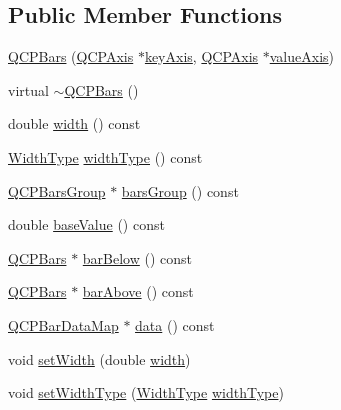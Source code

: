 \subsection*{Public Member Functions}
\begin{DoxyCompactItemize}
\item 
\hyperlink{class_q_c_p_bars_a64006999ad9dff308f40df41cef176ad}{Q\+C\+P\+Bars} (\hyperlink{class_q_c_p_axis}{Q\+C\+P\+Axis} $\ast$\hyperlink{class_q_c_p_abstract_plottable_a72c7a09c22963f2c943f07112b311103}{key\+Axis}, \hyperlink{class_q_c_p_axis}{Q\+C\+P\+Axis} $\ast$\hyperlink{class_q_c_p_abstract_plottable_a3106f9d34d330a6097a8ec5905e5b519}{value\+Axis})
\item 
virtual \hyperlink{class_q_c_p_bars_a4d880e28031ef120603f543379be2f22}{$\sim$\+Q\+C\+P\+Bars} ()
\item 
double \hyperlink{class_q_c_p_bars_a42798c38abd5f5db22bd45d77f429625}{width} () const 
\item 
\hyperlink{class_q_c_p_bars_a65dbbf1ab41cbe993d71521096ed4649}{Width\+Type} \hyperlink{class_q_c_p_bars_a8606651ada5804075f6affd04c88dd05}{width\+Type} () const 
\item 
\hyperlink{class_q_c_p_bars_group}{Q\+C\+P\+Bars\+Group} $\ast$ \hyperlink{class_q_c_p_bars_a6d6b2b17619a0ba9c7a88bb2b90fc178}{bars\+Group} () const 
\item 
double \hyperlink{class_q_c_p_bars_a3c8686a74396883fd1da87b2e325b043}{base\+Value} () const 
\item 
\hyperlink{class_q_c_p_bars}{Q\+C\+P\+Bars} $\ast$ \hyperlink{class_q_c_p_bars_a2c46a686cbad95f180ca3c2e88263961}{bar\+Below} () const 
\item 
\hyperlink{class_q_c_p_bars}{Q\+C\+P\+Bars} $\ast$ \hyperlink{class_q_c_p_bars_a9ca48a6577586825d85bdc1fbf410803}{bar\+Above} () const 
\item 
\hyperlink{qcustomplot_8h_aa846c77472cae93def9f1609d0c57191}{Q\+C\+P\+Bar\+Data\+Map} $\ast$ \hyperlink{class_q_c_p_bars_ac05c21de37f677545d06fd852ef8a743}{data} () const 
\item 
void \hyperlink{class_q_c_p_bars_afec6116579d44d5b706e0fa5e5332507}{set\+Width} (double \hyperlink{class_q_c_p_bars_a42798c38abd5f5db22bd45d77f429625}{width})
\item 
void \hyperlink{class_q_c_p_bars_adcaa3b41281bb2c0f7949b341592fcc0}{set\+Width\+Type} (\hyperlink{class_q_c_p_bars_a65dbbf1ab41cbe993d71521096ed4649}{Width\+Type} \hyperlink{class_q_c_p_bars_a8606651ada5804075f6affd04c88dd05}{width\+Type})
\item 

\end{DoxyCompactItemize}
